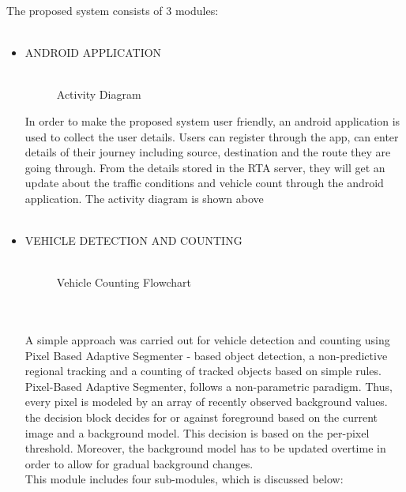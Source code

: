 The proposed system consists of 3 modules: \\ \\
\begin{itemize}
\item ANDROID APPLICATION\\ \\
\begin{figure}[ht] 
{\par}
\caption{Activity Diagram}
\end{figure}
\newpage
In order to make the proposed system user friendly, an android application is used to collect the user details. Users can register through the app, can enter details of their journey including source, destination and the route they are going through. From the details stored in the RTA server, they will get an update about the traffic conditions and vehicle count through the android application. The activity diagram is shown above \\ \\
\item VEHICLE DETECTION AND COUNTING\\ \\

\begin{figure}[ht] 
{\par}
\caption{Vehicle Counting Flowchart}
\end{figure}\\ \\

A simple approach was carried out for vehicle detection and counting using Pixel Based Adaptive Segmenter - based object detection, a non-predictive regional tracking and a counting of tracked objects based on simple rules. Pixel-Based Adaptive Segmenter, follows a non-parametric paradigm. Thus, every pixel is modeled by an array of recently observed background values. the decision block decides for or against foreground
based on the current image and a background model. This decision is based on the per-pixel threshold. Moreover, the background model has to be updated overtime in order to allow for gradual background changes.\\
\newpage
This module includes four sub-modules, which is discussed below:



\end{itemize}

